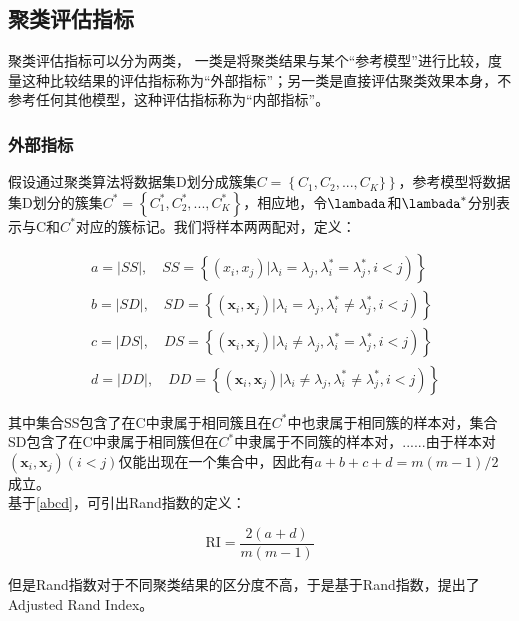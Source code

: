 \subsection{聚类评估指标}
聚类评估指标可以分为两类，
一类是将聚类结果与某个“参考模型”进行比较，度量这种比较结果的评估指标称为“外部指标”；另一类是直接评估聚类效果本身，不参考任何其他模型，这种评估指标称为“内部指标”。

\subsubsection{外部指标}
假设通过聚类算法将数据集D划分成簇集$C=\left\{C_1,C_2,...,C_K\}\right\}$，参考模型将数据集D划分的簇集$C^*=\left\{ C_{1}^{*},C_{2}^{*},...,C_{K}^{*} \right\} $，相应地，令$\lambada$和$\lambada^{*}$分别表示与C和$C^{*}$对应的簇标记。我们将样本两两配对，定义：

\begin{equation}
\label{abcd}
\begin{aligned}
&\left.a=|S S|, \quad S S=\left\{\left(x_{i}, x_{j}\right) | \lambda_{i}=\lambda_{j}, \lambda_{i}^{*}=\lambda_{j}^{*}, i<j\right)\right\}\\
&\left.b=|S D|, \quad S D=\left\{\left(\boldsymbol{x}_{i}, \boldsymbol{x}_{j}\right) | \lambda_{i}=\lambda_{j}, \lambda_{i}^{*} \neq \lambda_{j}^{*}, i<j\right)\right\}\\
&\left.c=|D S|, \quad D S=\left\{\left(\boldsymbol{x}_{i}, \boldsymbol{x}_{j}\right) | \lambda_{i} \neq \lambda_{j}, \lambda_{i}^{*}=\lambda_{j}^{*}, i<j\right)\right\}\\
&\left.d=|D D|, \quad D D=\left\{\left(\boldsymbol{x}_{i}, \boldsymbol{x}_{j}\right) | \lambda_{i} \neq \lambda_{j}, \lambda_{i}^{*} \neq \lambda_{j}^{*}, i<j\right)\right\}
\end{aligned}
\end{equation}

其中集合SS包含了在C中隶属于相同簇且在$C^{*}$中也隶属于相同簇的样本对，集合SD包含了在C中隶属于相同簇但在$C^{*}$中隶属于不同簇的样本对，......由于样本对$\left(\boldsymbol{x}_{i}, \boldsymbol{x}_{j}\right)(i<j)$仅能出现在一个集合中，因此有$a+b+c+d=m(m-1) / 2$成立。\\
基于\ref{abcd}，可引出Rand指数的定义：

\begin{equation}
\label{RI}
\mathrm{RI}=\frac{2(a+d)}{m(m-1)}
\end{equation}

但是Rand指数对于不同聚类结果的区分度不高，于是基于Rand指数，提出了Adjusted Rand Index。

